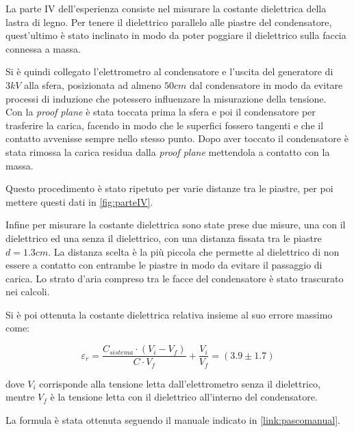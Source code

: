 {\fontsize{12}{14}\selectfont 

La parte IV dell'esperienza consiste nel misurare la costante dielettrica della lastra di legno. Per tenere il dielettrico parallelo alle piastre del condensatore, quest'ultimo è stato inclinato in modo da poter poggiare il dielettrico sulla faccia connessa a massa.

\par
Si è quindi collegato l'elettrometro al condensatore e l'uscita del generatore di $3kV$ alla sfera, posizionata ad almeno $50cm$ dal condensatore in modo da evitare processi di induzione che potessero influenzare la misurazione della tensione.
\\
Con la \emph{proof plane} è stata toccata prima la sfera e poi il condensatore per trasferire la carica, facendo in modo che le superfici fossero tangenti e che il contatto avvenisse sempre nello stesso punto. Dopo aver toccato il condensatore è stata rimossa la carica residua dalla \emph{proof plane} mettendola a contatto con la massa.
\par
Questo procedimento è stato ripetuto per varie distanze tra le piastre, per poi mettere questi dati in \autoref{fig:parteIV}.

\par
Infine per misurare la costante dielettrica sono state prese due misure, una con il dielettrico ed una senza il dielettrico, con una distanza fissata tra le piastre $d = 1.3cm$. La distanza scelta è la più piccola che permette al dielettrico di non essere a contatto con entrambe le piastre in modo da evitare il passaggio di carica. Lo strato d'aria compreso tra le facce del condensatore è stato trascurato nei calcoli.

\par
Si è poi ottenuta la costante dielettrica relativa insieme al suo errore massimo come:

\begin{equation*}
    \varepsilon_r = \dfrac{C_{sistema} \cdot (V_i-V_f)}{C \cdot V_f} + \dfrac{V_i}{V_f} = (3.9 \pm 1.7)
\end{equation*}

dove $V_i$ corrisponde alla tensione letta dall'elettrometro senza il dielettrico, mentre $V_f$ è la tensione letta con il dielettrico all'interno del condensatore.
\par
La formula è stata ottenuta seguendo il manuale indicato in \autoref{link:pascomanual}.
\par}